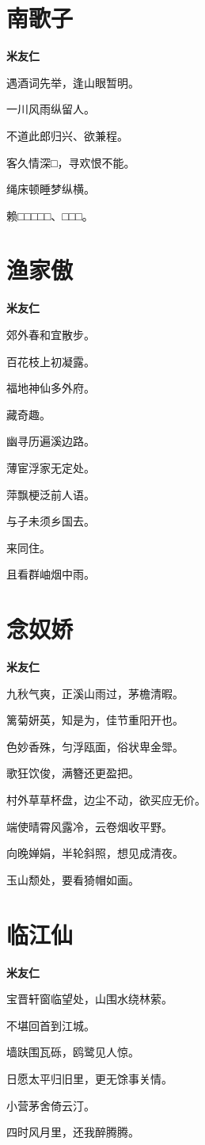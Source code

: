 \documentclass[12pt,a4paper]{ctexbook}
\begin{document}
\section{南歌子}
\textbf{米友仁}\par\vspace{0.5em}
遇酒词先举，逢山眼暂明。\par
一川风雨纵留人。\par
不道此郎归兴、欲兼程。\par
客久情深□，寻欢恨不能。\par
绳床顿睡梦纵横。\par
赖□□□□□、□□□。\par

\section{渔家傲}
\textbf{米友仁}\par\vspace{0.5em}
郊外春和宜散步。\par
百花枝上初凝露。\par
福地神仙多外府。\par
藏奇趣。\par
幽寻历遍溪边路。\par
薄宦浮家无定处。\par
萍飘梗泛前人语。\par
与子未须乡国去。\par
来同住。\par
且看群岫烟中雨。\par

\section{念奴娇}
\textbf{米友仁}\par\vspace{0.5em}
九秋气爽，正溪山雨过，茅檐清暇。\par
篱菊妍英，知是为，佳节重阳开也。\par
色妙香殊，匀浮瓯面，俗状卑金斝。\par
歌狂饮俊，满簪还更盈把。\par
村外草草杯盘，边尘不动，欲买应无价。\par
端使晴霄风露冷，云卷烟收平野。\par
向晚婵娟，半轮斜照，想见成清夜。\par
玉山颓处，要看猗帽如画。\par

\section{临江仙}
\textbf{米友仁}\par\vspace{0.5em}
宝晋轩窗临望处，山围水绕林萦。\par
不堪回首到江城。\par
墙趺围瓦砾，鸥鹭见人惊。\par
日愿太平归旧里，更无馀事关情。\par
小营茅舍倚云汀。\par
四时风月里，还我醉腾腾。\par
\end{document}
